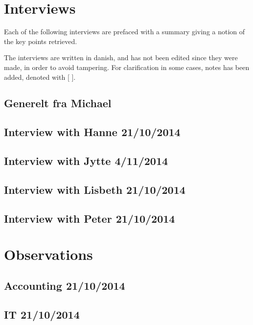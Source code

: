\chapter{Interviews}
\label{app:interviews}
Each of the following interviews are prefaced with a summary giving a notion of the key points retrieved.

The interviews are written in danish, and has not been edited since they were made, in order to avoid tampering.
For clarification in some cases, notes has been added, denoted with [ ].

\section{Generelt fra Michael}

\section{Interview with Hanne 21/10/2014}

\section{Interview with Jytte 4/11/2014}

\section{Interview with Lisbeth 21/10/2014}

\section{Interview with Peter 21/10/2014}

\chapter{Observations}
\section{Accounting 21/10/2014}

\section{IT 21/10/2014}
